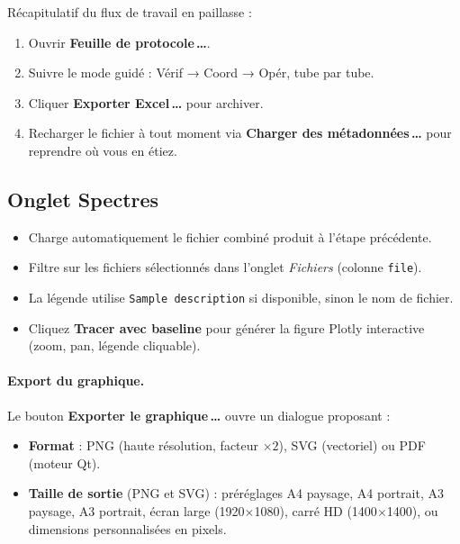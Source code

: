 \documentclass[12pt, a4paper]{article}
\begin{document}
\begin{remarque}
Récapitulatif du flux de travail en paillasse :
\begin{enumerate}
  \item Ouvrir \textbf{Feuille de protocole\,\ldots}.
  \item Suivre le mode guidé : Vérif → Coord → Opér, tube par tube.
  \item Cliquer \textbf{Exporter Excel\,\ldots} pour archiver.
  \item Recharger le fichier à tout moment via
        \textbf{Charger des métadonnées\,\ldots} pour reprendre où vous en
        étiez.
\end{enumerate}
\end{remarque}

\subsection{Onglet Spectres}

\begin{itemize}
  \item Charge automatiquement le fichier combiné produit à l'étape précédente.
  \item Filtre sur les fichiers sélectionnés dans l'onglet \textit{Fichiers}
        (colonne \texttt{file}).
  \item La légende utilise \texttt{Sample description} si disponible, sinon le
        nom de fichier.
  \item Cliquez \textbf{Tracer avec baseline} pour générer la figure Plotly
        interactive (zoom, pan, légende cliquable).
\end{itemize}

\paragraph{Export du graphique.}
Le bouton \textbf{Exporter le graphique\,\ldots} ouvre un dialogue proposant :
\begin{itemize}
  \item \textbf{Format} : PNG (haute résolution, facteur $\times 2$), SVG
        (vectoriel) ou PDF (moteur Qt).
  \item \textbf{Taille de sortie} (PNG et SVG) : préréglages A4 paysage, A4
        portrait, A3 paysage, A3 portrait, écran large (1920$\times$1080),
        carré HD (1400$\times$1400), ou dimensions personnalisées en pixels.
\end{itemize}
\end{document}
